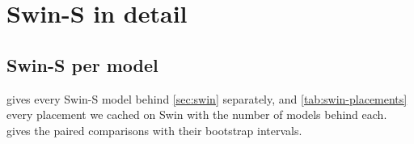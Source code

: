 
\FloatBarrier


\FloatBarrier
\clearpage

\section{Swin-S in detail}
\label{app:swin-group}

\subsection{Swin-S per model}
\label{app:swin}

 gives every Swin-S model behind \cref{sec:swin} separately, and \cref{tab:swin-placements} every placement we cached on Swin with the number of models behind each.  gives the paired comparisons with their bootstrap intervals.


\FloatBarrier



\FloatBarrier
\clearpage
